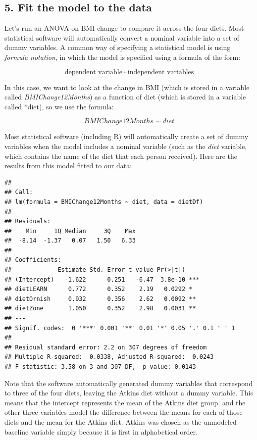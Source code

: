 \documentclass[
  12pt,
]{book}
\begin{document}
\hypertarget{fit-the-model-to-the-data}{%
\subsection{5. Fit the model to the data}\label{fit-the-model-to-the-data}}

Let's run an ANOVA on BMI change to compare it across the four diets. Most statistical software will automatically convert a nominal variable into a set of dummy variables. A common way of specifying a statistical model is using \emph{formula notation}, in which the model is specified using a formula of the form:

\[ 
\text{dependent variable} \sim \text{independent variables}
\]

In this case, we want to look at the change in BMI (which is stored in a variable called \emph{BMIChange12Months}) as a function of diet (which is stored in a variable called *diet), so we use the formula:

\[
BMIChange12Months \sim diet
\]

Most statistical software (including R) will automatically create a set of dummy variables when the model includes a nominal variable (such as the \emph{diet} variable, which contains the name of the diet that each person received). Here are the results from this model fitted to our data:

\begin{verbatim}
## 
## Call:
## lm(formula = BMIChange12Months ~ diet, data = dietDf)
## 
## Residuals:
##    Min     1Q Median     3Q    Max 
##  -8.14  -1.37   0.07   1.50   6.33 
## 
## Coefficients:
##             Estimate Std. Error t value Pr(>|t|)    
## (Intercept)   -1.622      0.251   -6.47  3.8e-10 ***
## dietLEARN      0.772      0.352    2.19   0.0292 *  
## dietOrnish     0.932      0.356    2.62   0.0092 ** 
## dietZone       1.050      0.352    2.98   0.0031 ** 
## ---
## Signif. codes:  0 '***' 0.001 '**' 0.01 '*' 0.05 '.' 0.1 ' ' 1
## 
## Residual standard error: 2.2 on 307 degrees of freedom
## Multiple R-squared:  0.0338, Adjusted R-squared:  0.0243 
## F-statistic: 3.58 on 3 and 307 DF,  p-value: 0.0143
\end{verbatim}

Note that the software automatically generated dummy variables that correspond to three of the four diets, leaving the Atkins diet without a dummy variable. This means that the intercept represents the mean of the Atkins diet group, and the other three variables model the difference between the means for each of those diets and the mean for the Atkins diet. Atkins was chosen as the unmodeled baseline variable simply because it is first in alphabetical order.
\end{document}
